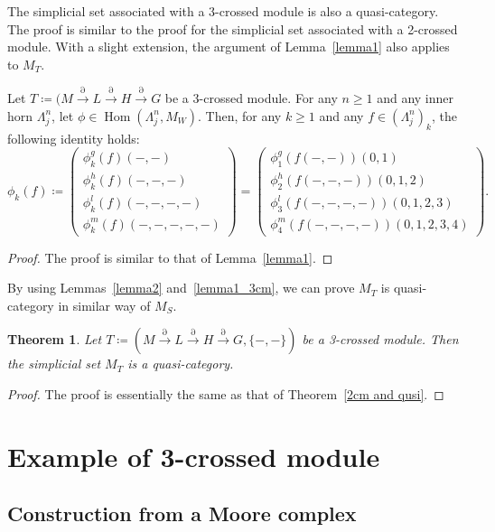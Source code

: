 \documentclass{tac}
\newtheorem{theorem}{Theorem}
\begin{document}
The simplicial set associated with a 3-crossed module is also a quasi-category.  
The proof is similar to the proof for the simplicial set associated with a 2-crossed module.
With a slight extension, the argument of Lemma~\ref{lemma1} also applies to \( M_T \).

\begin{lemma}
\label{lemma1_3cm}
Let \( T \coloneqq (M \xrightarrow{\partial} L \xrightarrow{\partial} H \xrightarrow{\partial} G \) be a 3-crossed module. For any \( n \ge 1 \) and any inner horn \( \Lambda^n_j \), let \( \phi \in \operatorname{Hom}(\Lambda^n_j, M_W) \). Then, for any \( k \ge 1 \) and any \( f \in (\Lambda^n_j)_k \), the following identity holds:
\[
\phi_k(f) 
\coloneqq
\begin{pmatrix}
\phi^g_k(f)(-,-) \\
\phi^h_k(f)(-,-,-) \\
\phi^l_k(f)(-,-,-,-)\\
\phi^m_k(f)(-,-,-,-,-)
\end{pmatrix}
=
\begin{pmatrix}
\phi^g_1(f(-,-))(0,1) \\
\phi^h_2(f(-,-,-))(0,1,2) \\
\phi^l_3(f(-,-,-,-))(0,1,2,3)\\
\phi^m_4(f(-,-,-,-))(0,1,2,3,4)
\end{pmatrix}.
\]
\end{lemma}
\begin{proof}
The proof is similar to that of Lemma~\ref{lemma1}.
\end{proof}

By using Lemmas~\ref{lemma2} and~\ref{lemma1_3cm}, we can prove $M_T$ is quasi-category in similar way of $M_S$.

\begin{theorem}
Let \( T \coloneqq (M \xrightarrow{\partial} L \xrightarrow{\partial} H \xrightarrow{\partial} G, \{-,-\}) \) be a 3-crossed module. Then the simplicial set $M_T$ is a quasi-category.
\end{theorem}
\begin{proof}
The proof is essentially the same as that of Theorem~\ref{2cm and qusi}.
\end{proof}


\section{Example of 3-crossed module}

\subsection{Construction from a Moore complex}
\label{EX of 3-crossed module}
\end{document}
